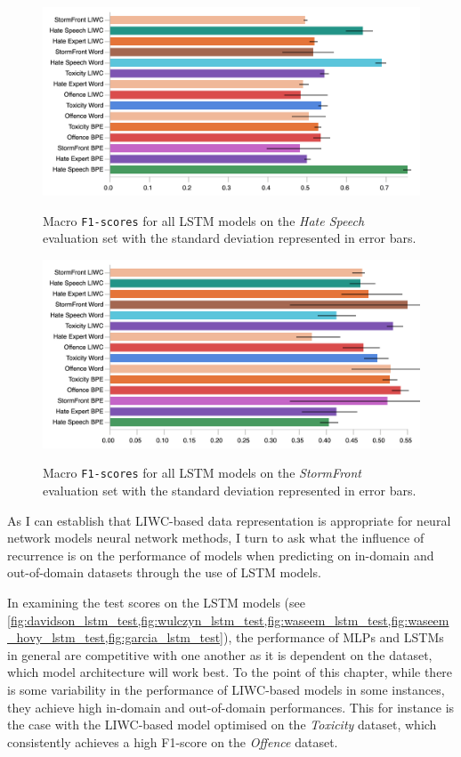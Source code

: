 \begin{figure}
\begin{minipage}{\textwidth}
    \centering
    \includegraphics[width=\textwidth]{all_lstm_waseem_hovy_test.pdf}
    \caption{Macro \texttt{F1-scores} for all LSTM models on the \textit{Hate Speech} evaluation set with the standard deviation represented in error bars.}
  \label{fig:waseem_hovy_lstm_test}  
  \vfill
    \includegraphics[width=\textwidth]{all_lstm_garcia_test.pdf}
  \caption{Macro \texttt{F1-scores} for all LSTM models on the \textit{StormFront} evaluation set with the standard deviation represented in error bars.}
  \label{fig:garcia_lstm_test}
\end{minipage}
\end{figure}

As I can establish that LIWC-based data representation is appropriate for neural network models neural network methods, I turn to ask what the influence of recurrence is on the performance of models when predicting on in-domain and out-of-domain datasets through the use of LSTM models.

In examining the test scores on the LSTM models (see \cref{fig:davidson_lstm_test,fig:wulczyn_lstm_test,fig:waseem_lstm_test,fig:waseem_hovy_lstm_test,fig:garcia_lstm_test}), the performance of MLPs and LSTMs in general are competitive with one another as it is dependent on the dataset, which model architecture will work best.
To the point of this chapter, while there is some variability in the performance of LIWC-based models in some instances, they achieve high in-domain and out-of-domain performances.
This for instance is the case with the LIWC-based model optimised on the \textit{Toxicity} dataset, which consistently achieves a high F1-score on the \textit{Offence} dataset.

